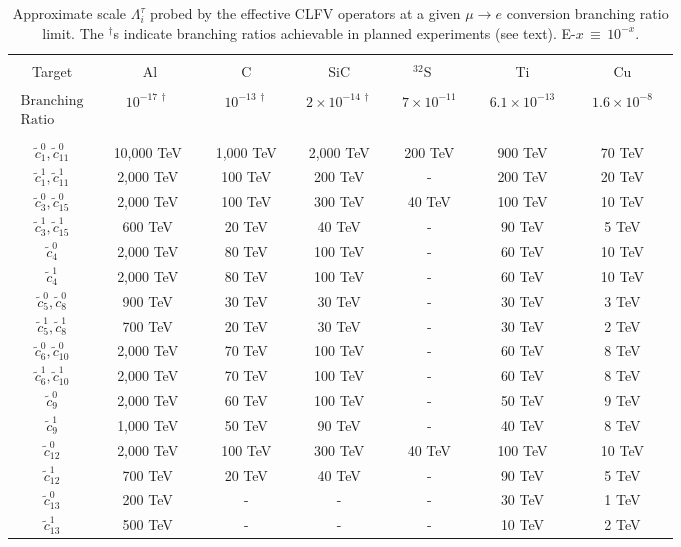 \documentclass{book}[letterpaper,12pt]
\begin{document}
\begin{table}
\caption{Approximate scale $\Lambda_i^{\tau}$ probed by the effective CLFV operators at a given $\mu \rightarrow e$ conversion branching ratio limit.  The $^\dagger$s indicate  
branching ratios achievable in planned experiments (see text).   E-$x \, \equiv \,10^{-x}.$}
\label{tab:LECscale}
\begin{tabular}{|c|c|c|c|c|c|c|}
\hline
 & & & & & &  \\[-7.5pt]
Target  &~~~~~ Al~~~~~&~~~~~C~~~~~&~~~~SiC~~~~&~~~$^{32}$S~~~~~&~~~~~Ti~~~~~&~~~~~Cu~~~~~ \\[1.6pt]
\hline 
 & & & & & &  \\[-7.5pt]
$\begin{array}{l} \mathrm{Branching} \\  \mathrm{Ratio} \end{array}$ & $10^{-17 \, \dagger}$ & $10^{-13 \, \dagger}$ & $2 \times 10^{-14 \, \dagger}$ & $7 \times 10^{-11}$ \cite{BADERTSCHER1982406} &  $6.1 \times 10^{-13}$ \cite{wintz} & $1.6 \times 10^{-8}$ \cite{PhysRevLett.28.1469} \\
 & & & & & &  \\[-7.5pt]
\hline
 & & & & & &  \\[-5.5pt]
$\tilde{c}_1^0,\tilde{c}_{11}^0$ &  10,000 TeV & 1,000 TeV & 2,000 TeV & 200 TeV & 900 TeV & 70 TeV\\
$\tilde{c}_1^1,\tilde{c}_{11}^1$ & 2,000 TeV & 100 TeV & 200 TeV & - & 200 TeV & 20 TeV\\
$\tilde{c}_3^0,\tilde{c}_{15}^0$ & 2,000 TeV & 100 TeV & 300 TeV & 40 TeV & 100 TeV & 10 TeV\\
$\tilde{c}_3^1,\tilde{c}_{15}^1$ & 600 TeV & 20 TeV & 40 TeV & - & 90 TeV & 5 TeV\\
$\tilde{c}_4^0$ & 2,000 TeV & 80 TeV & 100 TeV & - & 60 TeV & 10 TeV\\
$\tilde{c}_4^1$ & 2,000 TeV & 80 TeV & 100 TeV & - & 60 TeV & 10 TeV\\
$\tilde{c}_5^0,\tilde{c}_8^0$ & 900 TeV & 30 TeV & 30 TeV & - & 30 TeV & 3 TeV\\
$\tilde{c}_5^1,\tilde{c}_8^1$ & 700 TeV & 20 TeV & 30 TeV & - & 30 TeV & 2 TeV\\
$\tilde{c}_6^0,\tilde{c}_{10}^0$ & 2,000 TeV & 70 TeV & 100 TeV & - & 60 TeV & 8 TeV\\
$\tilde{c}_6^1,\tilde{c}_{10}^1$ & 2,000 TeV & 70 TeV & 100 TeV & - & 60 TeV & 8 TeV\\
$\tilde{c}_9^0$ & 2,000 TeV & 60 TeV & 100 TeV & - & 50 TeV & 9 TeV\\
$\tilde{c}_9^1$ & 1,000 TeV & 50 TeV & 90 TeV & - & 40 TeV & 8 TeV\\
$\tilde{c}_{12}^0$ & 2,000 TeV & 100 TeV & 300 TeV & 40 TeV & 100 TeV & 10 TeV\\
$\tilde{c}_{12}^1$ & 700 TeV & 20 TeV & 40 TeV & - & 90 TeV & 5 TeV\\
$\tilde{c}_{13}^0$ & 200 TeV & - & - & - & 30 TeV & 1 TeV\\
$\tilde{c}_{13}^1$ & 500 TeV & - & - & - & 10 TeV & 2 TeV\\[2.6pt]
\hline
\end{tabular}
\end{table} 
\end{document}
